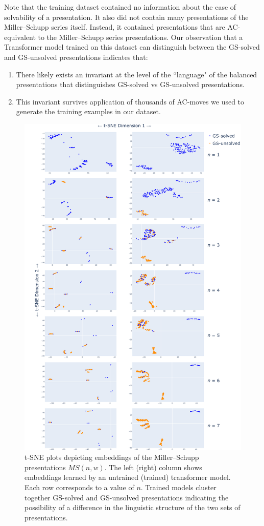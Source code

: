 Note that the training dataset contained no information about the ease of solvability of a presentation.
It also did not contain many presentations of the Miller--Schupp series itself.
Instead, it contained presentations that are AC-equivalent to the Miller--Schupp series presentations.
Our observation that a Transformer model trained on this dataset can distinguish between the GS-solved and GS-unsolved presentations indicates that:
\begin{enumerate}[label=\alph*)]
	\item There likely exists an invariant at the level of the ``language" of the balanced presentations that distinguishes GS-solved vs GS-unsolved presentations.
	\item This invariant survives application of thousands of AC-moves we used to generate the training examples in our dataset.
\end{enumerate}

\begin{figure}
	\centering
	\includegraphics[scale=0.16]{fig/embeddings.pdf}
	\captionsetup{width=1.1\textwidth}
	\caption{t-SNE plots depicting embeddings of the Miller--Schupp presentations $MS(n, w)$.
	The left (right) column shows embeddings learned by an untrained (trained) transformer model.
	Each row corresponds to a value of $n$.
	Trained models cluster together GS-solved and GS-unsolved presentations indicating the possibility of a difference in the linguistic structure of the two sets of presentations.}
	\label{fig:tsne_embeddings}
\end{figure}
